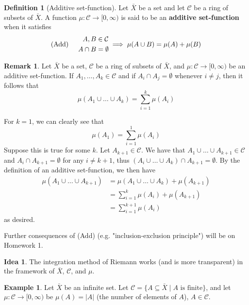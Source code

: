 \documentclass[11pt]{article}
\makeatletter
\theoremstyle{definition}
\newtheorem{defn}[thm]{Definition}
\newtheorem{exmp}[thm]{Example}
\newtheorem{remark}[thm]{Remark}
\newtheorem{idea}[thm]{Idea}
\newenvironment{pf}[1][\proofname]{\par
  \pushQED{\qed}%
  \normalfont \topsep0\p@\relax
  \trivlist
  \item[\hskip\labelsep\itshape
  #1\@addpunct{.}]\ignorespaces
}{%
  \popQED\endtrivlist\@endpefalse
}
\makeatother
\begin{document}
\begin{defn}[Additive set-function]
Let $\bar{X}$ be a set and let $\mathcal{C}$ be a ring of subsets of $\bar{X}$. A function $\mu : \mathcal{C} \to [0, \infty)$ is said to be an {\bf additive set-function} when it satisfies
$${\rm (Add)} \hspace{0.5cm}
\begin{aligned} 
A, B & \in \mathcal{C} \\
A \cap B & = \emptyset
\end{aligned} \implies \mu(A \cup B) = \mu(A) + \mu(B)
$$
\end{defn}

\begin{remark}
Let $\bar{X}$ be a set, $\mathcal{C}$ be a ring of subsets of $\bar{X}$, and $\mu : \mathcal{C} \to [0, \infty)$ be an additive set-function. If $A_1, \dots, A_k \in \mathcal{C}$ and if $A_i \cap A_j = \emptyset$ whenever $i \ne j$, then it follows that
$$\mu(A_1 \cup \dots \cup A_k) = \sum_{i=1}^k \mu(A_i)$$
\end{remark}
\begin{pf}
For $k = 1$, we can clearly see that
$$\mu(A_1) = \sum_{i=1}^1 \mu(A_i)$$
Suppose this is true for some $k$. Let $A_{k+1} \in \mathcal{C}$. We have that $A_1 \cup \dots \cup A_{k+1} \in \mathcal{C}$ and $A_i \cap A_{k+1} = \emptyset$ for any $i \ne k+1$, thus $(A_i \cup \dots \cup A_k) \cap A_{k+1} = \emptyset$. By the definition of an additive set-function, we then have
\begin{align*}
    \mu(A_1 \cup \dots \cup A_{k+1}) &= \mu(A_1 \cup \dots \cup A_k) + \mu(A_{k+1}) \\
    &= \sum_{i=1}^k \mu(A_i) + \mu(A_{k+1}) \\
    &= \sum_{i=1}^{k+1} \mu(A_i)
\end{align*}
as desired.
\end{pf}

Further consequences of (Add) (e.g. "inclusion-exclusion principle") will be on Homework 1.

\begin{idea}
The integration method of Riemann works (and is more transparent) in the framework of $\bar{X}$, $\mathcal{C}$, and $\mu$.
\end{idea}

\begin{exmp}
Let $\bar{X}$ be an infinite set. Let $\mathcal{C} = \{A \subseteq \bar{X} \mid A \text{ is finite}\}$, and let $\mu : \mathcal{C} \to [0, \infty)$ be $\mu(A) = |A|$ (the number of elements of $A$), $A \in \mathcal{C}$.
\end{exmp}
\end{document}
